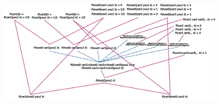 \documentclass[\ifafour a4paper,12pt,\else a5paper,10pt,\fi%
onecolumn,oneside,article,%
british%
]{memoir}
\theoremstyle{remark}
\theoremstyle{innote}
\newcommand*{\asudedication}[1]{%
{\par\centering\textit{#1}\par}}
\renewcommand*{\|}{\nonscript\,\vert\nonscript\;\mathopen{}}
\begin{document}
\begin{figure}[p]
  \centering
  \includegraphics[width=1.06\textheight,angle=-90]{prob_tree_monty2.png}%
\end{figure}














\end{document}
